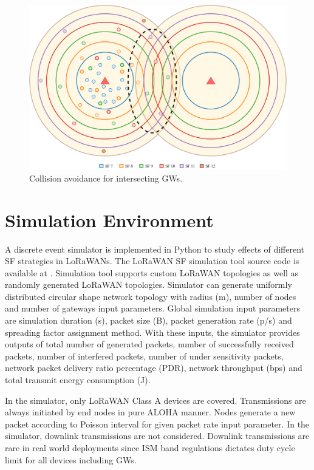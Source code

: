 \documentclass[conference]{IEEEtran}
\begin{document}
\begin{figure}
\centering
\includegraphics[width=\linewidth]{collision_solution_multi_gw}
\caption{Collision avoidance for intersecting GWs.}
\label{fig:collision_solution_multi_gw}
\end{figure}


\section{Simulation Environment} \label{Simulation Environment}
\par A discrete event simulator is implemented in Python to study effects of different SF strategies in LoRaWANs. The LoRaWAN SF simulation tool source code is available at \cite{simlorasf}. Simulation tool supports custom LoRaWAN topologies as well as randomly generated LoRaWAN topologies. Simulator can generate uniformly distributed circular shape network topology with radius (m), number of nodes and number of gateways input parameters. Global simulation input parameters are simulation duration (s), packet size (B), packet generation rate (p/s) and spreading factor assignment method. With these inputs, the simulator provides outputs of total number of generated packets, number of successfully received packets, number of interfered packets, number of under sensitivity packets, network packet delivery ratio percentage (PDR), network throughput (bps) and total transmit energy consumption (J).

\par In the simulator, only LoRaWAN Class A devices are covered. Transmissions are always initiated by end nodes in pure ALOHA manner. Nodes generate a new packet according to Poisson interval for given packet rate input parameter. In the simulator, downlink transmissions are not considered. Downlink transmissions are rare in real world deployments since ISM band regulations dictates duty cycle limit for all devices including GWs.
\end{document}
